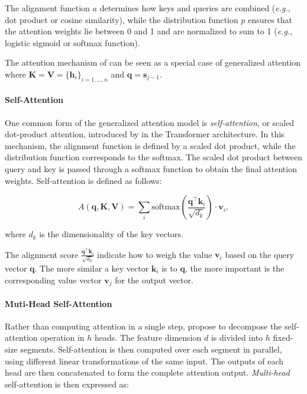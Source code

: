 \noindent The alignment function $a$ determines how keys and queries are combined (\textit{e.g.}, dot product or cosine similarity), while the distribution function $p$ ensures that the attention weights lie between 0 and 1 and are normalized to sum to 1 (\textit{e.g.}, logistic sigmoid or softmax function).

The attention mechanism of \citet{bahdanau2014neural} can be seen as a special case of generalized attention where $\bm{K} = \bm{V} = \{\bm{h}_i\}_{i=1, \ldots, n}$ and $\bm{q} = \bm{s}_{j-1}$. 


\paragraph{Self-Attention} One common form of the generalized attention model is \textit{self-attention}, or scaled dot-product attention, introduced by \citet{vaswani2017attention} in the Transformer architecture. In this mechanism, the alignment function is defined by a scaled dot product, while the distribution function corresponds to the softmax. The scaled dot product between query and key is passed through a softmax function to obtain the final attention weights. Self-attention is defined as follows:

\begin{equation}
    A(\bm{q}, \bm{K}, \bm{V}) = \sum_i \textrm{softmax}\left(\frac{\bm{q}^{\top} \bm{k}_i}{\sqrt{d_k}}\right) \cdot \bm{v}_i,
\end{equation}

\noindent where $d_k$ is the dimensionality of the key vectors.

The alignment score $\frac{\bm{q}^{\top} \bm{k}_i}{\sqrt{d_k}}$ indicate how to weigh the value $\bm{v}_i$ based on the query vector $\bm{q}$. The more similar a key vector $\bm{k}_i$ is to $\bm{q}$, the more important is the corresponding value vector $\bm{v}_j$ for the output vector. 


\paragraph{Muti-Head Self-Attention} Rather than computing attention in a single step, \citet{vaswani2017attention} propose to decompose the self-attention operation in $h$ heads. The feature dimension $d$ is divided into $h$ fixed-size segments. Self-attention is then computed over each segment in parallel, using different linear transformations of the same input. The outputs of each head are then concatenated to form the complete attention output. \textit{Multi-head} self-attention is then expressed as:

